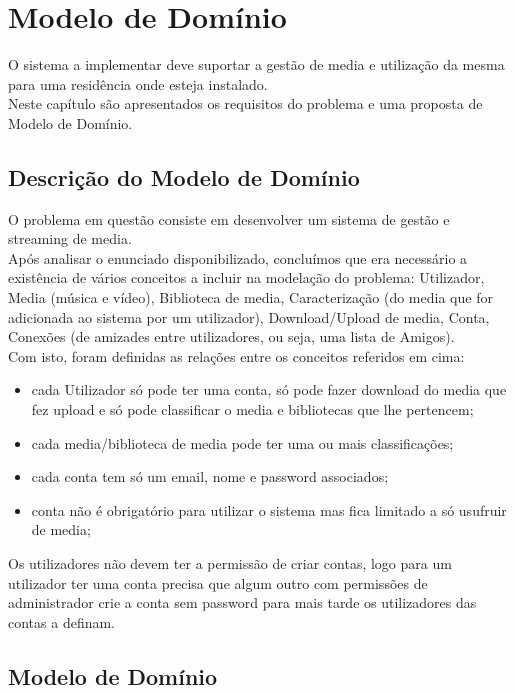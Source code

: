 \documentclass[a4paper]{report}
\begin{document}
\chapter{Modelo de Domínio}

O sistema a implementar deve suportar a gestão de media e utilização da mesma
para uma residência onde esteja instalado.\\
Neste capítulo são apresentados os requisitos do problema e uma proposta de 
Modelo de Domínio.

\section{Descrição do Modelo de Domínio}

O problema em questão consiste em desenvolver um sistema de gestão e streaming
de media.\\
Após analisar o enunciado disponibilizado, concluímos que era necessário a
existência de vários conceitos a incluir na modelação do problema: Utilizador,
Media (música e vídeo), Biblioteca de media, Caracterização (do media que for
adicionada ao sistema por um utilizador), Download/Upload de media, Conta,
Conexões (de amizades entre utilizadores, ou seja, uma lista de Amigos).\\
Com isto, foram definidas as relações entre os conceitos referidos em cima:
\begin{itemize}
    \item cada Utilizador só pode ter uma conta, só pode fazer download do
        media que fez upload e só pode classificar o media e bibliotecas
        que lhe pertencem;
    \item cada media/biblioteca de media pode ter uma ou mais classificações;
    \item cada conta tem só um email, nome e password associados;
    \item conta não é obrigatório para utilizar o sistema mas fica limitado 
        a só usufruir de media;
\end{itemize}
Os utilizadores não devem ter a permissão de criar contas, logo para um
utilizador ter uma conta precisa que algum outro com permissões de
administrador crie a conta sem password para mais tarde os utilizadores
das contas a definam.

\section{Modelo de Domínio}
\end{document}
